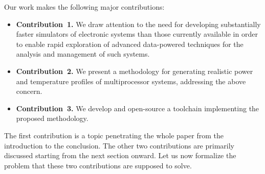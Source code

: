 Our work makes the following major contributions:

\begin{itemize}
  \item {\bfseries Contribution~1.} We draw attention to the need for
  developing substantially faster simulators of electronic systems than those
  currently available in order to enable rapid exploration of advanced
  data-powered techniques for the analysis and management of such systems.

  \item {\bfseries Contribution~2.} We present a methodology for generating
  realistic power and temperature profiles of multiprocessor systems,
  addressing the above concern.

  \item {\bfseries Contribution~3.} We develop and open-source a toolchain
  implementing the proposed methodology.
\end{itemize}

The first contribution is a topic penetrating the whole paper from the
introduction to the conclusion. The other two contributions are primarily
discussed starting from the next section onward. Let us now formalize the
problem that these two contributions are supposed to solve.
